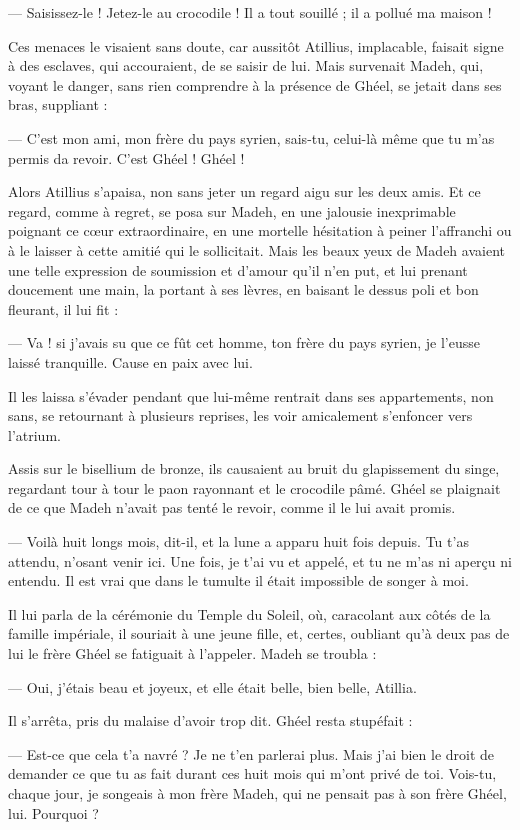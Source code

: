 \documentclass[a4paper, 11pt, oneside, polutonikogreek, french]{article}
\begin{document}
--- Saisissez-le ! Jetez-le au crocodile ! Il a tout souillé ; il a pollué ma maison !

Ces menaces le visaient sans doute, car aussitôt Atillius, implacable, faisait signe à des esclaves, qui accouraient, de se saisir de lui. Mais survenait Madeh, qui, voyant le danger, sans rien comprendre à la présence de Ghéel, se jetait dans ses bras, suppliant :

--- C'est mon ami, mon frère du pays syrien, sais-tu, celui-là même que tu m'as permis da revoir. C'est Ghéel ! Ghéel !

Alors Atillius s'apaisa, non sans jeter un regard aigu sur les deux amis. Et ce regard, comme à regret, se posa sur Madeh, en une jalousie inexprimable poignant ce cœur extraordinaire, en une mortelle hésitation à peiner l'affranchi ou à le laisser à cette amitié qui le sollicitait. Mais les beaux yeux de Madeh avaient une telle expression de soumission et d'amour qu'il n'en put, et lui prenant doucement une main, la portant à ses lèvres, en baisant le dessus poli et bon fleurant, il lui fit :

--- Va ! si j'avais su que ce fût cet homme, ton frère du pays syrien, je l'eusse laissé tranquille. Cause en paix avec lui.

Il les laissa s'évader pendant que lui-même rentrait dans ses appartements, non sans, se retournant à plusieurs reprises, les voir amicalement s'enfoncer vers l'atrium.

Assis sur le bisellium de bronze, ils causaient au bruit du glapissement du singe, regardant tour à tour le paon rayonnant et le crocodile pâmé. Ghéel se plaignait de ce que Madeh n'avait pas tenté le revoir, comme il le lui avait promis.

--- Voilà huit longs mois, dit-il, et la lune a apparu huit fois depuis. Tu t’as attendu, n'osant venir ici. Une fois, je t'ai vu et appelé, et tu ne m'as ni aperçu ni entendu. Il est vrai que dans le tumulte il était impossible de songer à moi.

Il lui parla de la cérémonie du Temple du Soleil, où, caracolant aux côtés de la famille impériale, il souriait à une jeune fille, et, certes, oubliant qu'à deux pas de lui le frère Ghéel se fatiguait à l'appeler. Madeh se troubla :

--- Oui, j'étais beau et joyeux, et elle était belle, bien belle, Atillia.

Il s'arrêta, pris du malaise d'avoir trop dit. Ghéel resta stupéfait :

--- Est-ce que cela t'a navré ? Je ne t'en parlerai plus. Mais j'ai bien le droit de demander ce que tu as fait durant ces huit mois qui m'ont privé de toi. Vois-tu, chaque jour, je songeais à mon frère Madeh, qui ne pensait pas à son frère Ghéel, lui. Pourquoi ?
\end{document}
